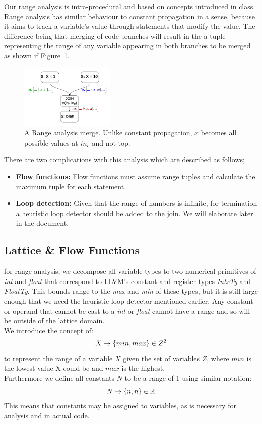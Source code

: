 Our range analysis is intra-procedural and based on concepts introduced in class. Range analysis has similar behaviour to constant propagation in a sense, because it aims to track a variable's value through statements that modify the value. The difference being that merging of code branches will result in the a tuple representing the range of any variable appearing in both branches to be merged as shown if Figure~\ref{RngMergeNode}.\\
\begin{figure}[here]
\includegraphics[width=0.4\textwidth]{MergeNode}
\caption{A Range analysis merge. Unlike constant propagation, $x$ becomes all possible values at $in_c$ and not top. }
\label{RngMergeNode}
\end{figure}
There are two complications with this analysis which are described as follows;\\
\begin{itemize}
\item{\textbf{Flow functions:} Flow functions must assume range tuples and calculate the maximum tuple for each statement.}
\item{\textbf{Loop detection:} Given that the range of numbers is infinite, for termination a heuristic loop detector should be added to the join. We will elaborate later in the document.}
\end{itemize}
\subsection{Lattice \& Flow Functions}
for range analysis, we decompose all variable types to two numerical primitives of \emph{int} and \emph{float} that correspond to LLVM's constant and register types \emph{IntxTy} and \emph{FloatTy}. This bounds range to the \emph{max} and \emph{min} of these types, but it is still large enough that we need the heuristic loop detector mentioned earlier. Any constant or operand that cannot be cast to a \emph{int} or \emph{float} cannot have a range and so will be outside of the lattice domain.\\
We introduce the concept of:
$$ X \rightarrow \{min,max\} \in Z^2$$
to represent the range of a variable $X$ given the set of variables $Z$, where $min$ is the lowest value X could be and $max$ is the highest. \\
Furthermore we define all constants $N$ to be a range of 1 using similar notation: 
$$ N \rightarrow\{n,n\} \in \mathbb{R}$$
This means that constants may be assigned to variables, as is necessary for analysis and in actual code. \\
